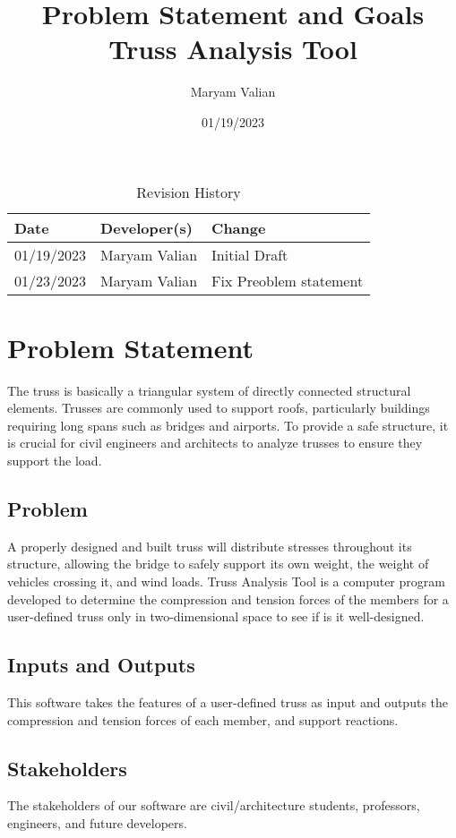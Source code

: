\documentclass{article}
\title{Problem Statement and Goals\\Truss Analysis Tool}
\author{Maryam Valian}
\date{01/19/2023}
\begin{document}
\maketitle

\begin{table}[hp]
\caption{Revision History} \label{TblRevisionHistory}
\begin{tabularx}{\textwidth}{llX}
\toprule
\textbf{Date} & \textbf{Developer(s)} & \textbf{Change}\\
\midrule
01/19/2023 & Maryam Valian & Initial Draft\\
01/23/2023 & Maryam Valian & Fix Preoblem statement\\

\bottomrule
\end{tabularx}
\end{table}

\section{Problem Statement}

The truss is basically a triangular system of directly connected structural elements. Trusses are commonly used to support roofs, particularly buildings requiring long spans
such as bridges and airports. To provide a safe structure, it is crucial for civil engineers and
architects to analyze trusses to ensure they support the load.


\subsection{Problem}
A properly designed and built truss will distribute stresses throughout its structure, allowing the bridge to safely support its own weight, the weight of vehicles crossing it, and wind loads. Truss Analysis Tool is a computer program developed to determine the compression and tension forces of the members for a user-defined  truss only in two-dimensional space to see if is it well-designed.

\subsection{Inputs and Outputs}

This software takes the features of a user-defined truss as input and outputs the compression and tension forces of each member, and support reactions.


\subsection{Stakeholders}
The stakeholders of our software are civil/architecture students, professors, engineers, and future developers.
\end{document}
